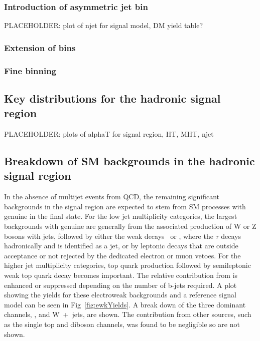 
\subsubsection{Introduction of asymmetric jet bin}


PLACEHOLDER: plot of njet for signal model, DM yield table?

\subsubsection{Extension of \HT bins}

\subsubsection{Fine \njet binning}

\subsection{Key distributions for the hadronic signal
  region\label{sec:mc-data-comp}}

PLACEHOLDER: plots of alphaT for signal region, HT, MHT, njet


\subsection{Breakdown of SM backgrounds in the hadronic signal
  region\label{sec:bkgd-comp}}

In the absence of multijet events from QCD, the remaining significant
backgrounds in the signal region are expected to stem from SM
processes with genuine \met in the final state. For the low jet
multiplicity categories, the largest backgrounds with genuine \met are
generally from the associated production of W or Z bosons with jets,
followed by either the weak decays \znunu\ or \wtaunu, where the
$\tau$ decays hadronically and is identified as a jet, or by leptonic
decays that are outside acceptance or not rejected by the dedicated
electron or muon vetoes. For the higher jet multiplicity categories,
top quark production followed by semileptonic weak top quark decay
becomes important. The relative contribution from \ttbar is enhanced
or suppressed depending on the number of b-jets required. 
A plot showing the yields for these electroweak backgrounds and a reference
signal model can be seen in Fig~\ref{fig:ewkYields}. A break down of the three
dominant channels, \zinv, \ttbar and W~+~jets, are shown. The contribution from
other sources, such as the single top and diboson channels, was found to be
negligible so are not shown.

